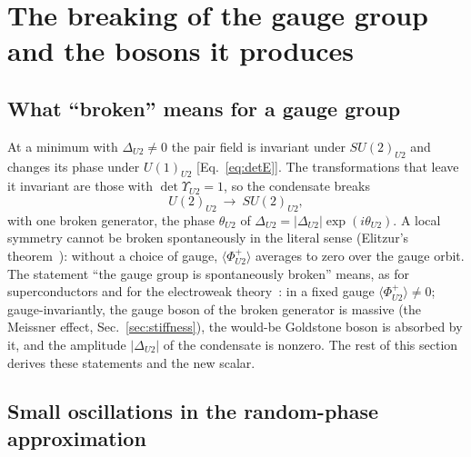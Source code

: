 \section{The breaking of the gauge group and the bosons it produces}
\label{sec:breaking}

\subsection{What ``broken'' means for a gauge group}

At a minimum with $\Delta_{U2}\neq0$ the pair field is invariant under $SU(2)_{U2}$ and changes its
phase under $U(1)_{U2}$ [Eq.~\eqref{eq:detE}]. The transformations that leave it invariant are
those with $\det\Upsilon_{U2}=1$, so the condensate breaks
\begin{equation}
U(2)_{U2}\ \to\ SU(2)_{U2},
\label{eq:breaking}
\end{equation}
with one broken generator, the phase $\theta_{U2}$ of $\Delta_{U2}=|\Delta_{U2}|\exp(i\theta_{U2})$. A local
symmetry cannot be broken spontaneously in the literal sense (Elitzur's theorem~\cite{Elitzur1975}):
without a choice of gauge, $\langle\Phi^+_{U2}\rangle$ averages to zero over the gauge orbit. The
statement ``the gauge group is spontaneously broken'' means, as for superconductors and for the
electroweak theory~\cite{Anderson1963,EnglertBrout1964,Higgs1964,GHK1964}: in a fixed gauge
$\langle\Phi^+_{U2}\rangle\neq0$; gauge-invariantly, the gauge boson of the broken generator is
massive (the Meissner effect, Sec.~\ref{sec:stiffness}), the would-be Goldstone boson is absorbed by
it, and the amplitude $|\Delta_{U2}|$ of the condensate is nonzero. The rest of this section derives
these statements and the new scalar.

\subsection{Small oscillations in the random-phase approximation}

